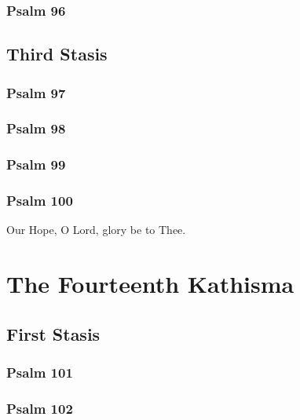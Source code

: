\documentclass[12pt]{book}
\newcommand{\kathismabreak}{
  \medskip
  \begin{center}
  \begin{footnotesize}
  

  

  

  
  \end{footnotesize}
  \end{center}
  \smallbreak
}
\newcommand{\kathismaend}{
  \medskip
  \begin{center}
  \begin{footnotesize}
  

  

  Our Hope, O Lord, glory be to Thee.
  \end{footnotesize}
  \end{center}
  \smallbreak
}
\begin{document}
\subsubsection{Psalm 96}


\kathismabreak

\pagebreak %
\subsection{Third Stasis}

\subsubsection{Psalm 97}


\subsubsection{Psalm 98}


\subsubsection{Psalm 99}


\subsubsection{Psalm 100}


\pagebreak %
\kathismaend

\section{The Fourteenth Kathisma}

\subsection{First Stasis}

\subsubsection{Psalm 101}


\subsubsection{Psalm 102}

\end{document}
